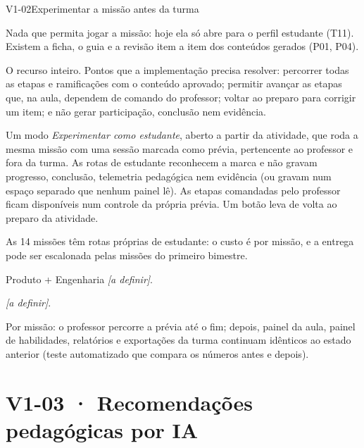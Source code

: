 \begin{resposta}{V1-02}{Experimentar a missão antes da turma}{\naoimpl}
\begin{campos}
  \item[Existe] Nada que permita jogar a missão: hoje ela só abre para o
    perfil estudante (T11). Existem a ficha, o guia e a revisão item a item
    dos conteúdos gerados (P01, P04).
  \item[Diferença] O recurso inteiro. Pontos que a implementação precisa
    resolver: percorrer todas as etapas e ramificações com o conteúdo
    aprovado; permitir avançar as etapas que, na aula, dependem de comando do
    professor; voltar ao preparo para corrigir um item; e não gerar
    participação, conclusão nem evidência.
  \item[Proposta] Um modo \emph{Experimentar como estudante}, aberto a partir
    da atividade, que roda a mesma missão com uma sessão marcada como
    prévia, pertencente ao professor e fora da turma. As rotas de estudante
    reconhecem a marca e não gravam progresso, conclusão, telemetria
    pedagógica nem evidência (ou gravam num espaço separado que nenhum painel
    lê). As etapas comandadas pelo professor ficam disponíveis num controle
    da própria prévia. Um botão leva de volta ao preparo da atividade.
  \item[Limitações] As 14 missões têm rotas próprias de estudante: o custo é
    por missão, e a entrega pode ser escalonada pelas missões do primeiro
    bimestre.
  \item[Responsável] Produto + Engenharia \textit{[a definir]}.
  \item[Homologação] \textit{[a definir]}.
  \item[Aceite] Por missão: o professor percorre a prévia até o fim; depois,
    painel da aula, painel de habilidades, relatórios e exportações da turma
    continuam idênticos ao estado anterior (teste automatizado que compara os
    números antes e depois).
\end{campos}
\end{resposta}

\section{V1-03 · Recomendações pedagógicas por IA}

